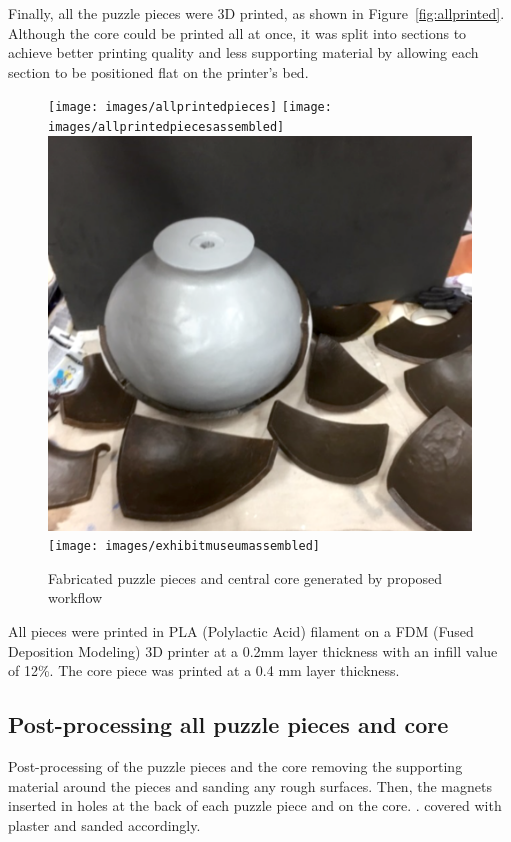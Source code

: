 \documentclass[acmlarge,screen,dvipsnames]{acmart}
\begin{document}
Finally, all the puzzle pieces were 3D printed, as shown in
Figure~\ref{fig:allprinted}. Although the core could be printed all at
once, it was split into  sections to achieve better printing
quality and less supporting material by allowing each section to be
positioned flat on the printer's bed.

\begin{figure}[h]
  \centering

  \centering
  {\texttt{[image: images/allprintedpieces]}}
  {\texttt{[image: images/allprintedpiecesassembled]}}\\
   {\includegraphics[width=0.4299\linewidth]{images/painting}}
  {\texttt{[image: images/exhibitmuseumassembled]}}
    \caption{Fabricated puzzle pieces and central core generated by proposed workflow }
\end{figure}

All pieces were printed in PLA (Polylactic Acid) filament on a FDM
(Fused Deposition Modeling) 3D printer at a 0.2mm layer thickness with
an infill value of 12\%. The core piece was printed at a 0.4 mm layer
thickness.


\subsection{Post-processing all puzzle pieces and core}

Post-processing of the puzzle pieces and the core  removing
the supporting material around the pieces and sanding any rough
surfaces. Then, the magnets  inserted in holes at the back of each
puzzle piece and on the core. .  covered \MSedit[afterwards]{} with plaster and sanded accordingly.
\end{document}
